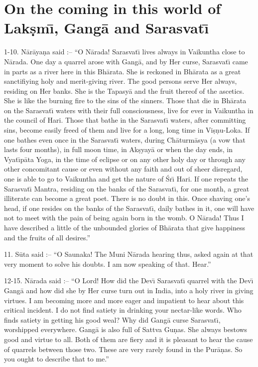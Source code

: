 \chapter{On the coming in this world of Lak\d{s}m\={\i}, Gang\=a and Sarasvat\={\i}}

1-10. N\=ar\=aya\d{n}a said :-- ``O N\=arada! Sarasvat\={\i} lives always in Vaikuntha close to N\=arada. One day a quarrel arose with Gang\=a, and by Her curse, Sarasvat\={\i} came in parts as a river here in this Bh\=arata. She is reckoned in Bh\=arata as a great sanctifiying holy and merit-giving river. The good persons serve Her always, residing on Her banks. She is the Tapasy\=a and the fruit thereof of the ascetics. She is like the burning fire to the sins of the sinners. Those that die in Bh\=arata on the Sarasvat\={\i} waters with their full consciousness, live for ever in Vaikuntha in the council of Hari. Those that bathe in the Sarasvat\={\i} waters, after committing sins, become easily freed of them and live for a long, long time in Vi\d{s}\d{n}u-Loka. If one bathes even once in the Sarasvat\={\i} waters, during Ch\=aturm\=asya (a vow that lasts four months), in full moon time, in Ak\d{s}yay\=a or when the day ends, in Vyat\={\i}p\=ata Yoga, in the time of eclipse or on any other holy day or through any other concomitant cause or even without any faith and out of sheer disregard, one is able to go to Vaikuntha and get the nature of \'Sr\={\i} Hari. If one repeats the Sarasvat\={\i} Mantra, residing on the banks of the Sarasvat\={\i}, for one month, a great illiterate can become a great poet. There is no doubt in this. Once shaving one's head, if one resides on the banks of the Sarasvat\={\i}, daily bathes in it, one will have not to meet with the pain of being again born in the womb. O N\=arada! Thus I have described a little of the unbounded glories of Bh\=arata that give happiness and the fruits of all desires.''

11. S\=uta said :-- ``O Saunaka! The Muni N\=arada hearing thus, asked again at that very moment to solve his doubts. I am now speaking of that. Hear.''

12-15. N\=arada said :-- ``O Lord! How did the Dev\={\i} Sarasvat\={\i} quarrel with the Dev\={\i} Gang\=a and how did she by Her curse turn out in India, into a holy river in giving virtues. I am becoming more and more eager and impatient to hear about this critical incident. I do not find satiety in drinking your nectar-like words. Who finds satiety in getting his good weal? Why did Gang\=a curse Sarasvat\={\i}, worshipped everywhere. Gang\=a is also full of Sattva Gu\d{n}as. She always bestows good and virtue to all. Both of them are fiery and it is pleasant to hear the cause of quarrels between those two. These are very rarely found in the Pur\=a\d{n}as. So you ought to describe that to me.''

